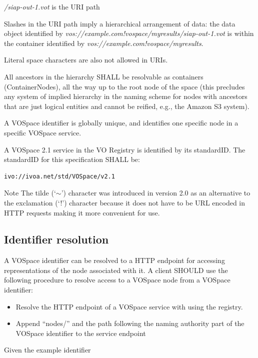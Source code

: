 \documentclass[11pt,a4paper]{ivoa}
\begin{document}
\emph{/siap-out-1.vot} is the URI path

Slashes in the URI path imply a hierarchical arrangement of data: the data object identified by \emph{vos://example.com!vospace/myresults/siap-out-1.vot} is within the container identified by \emph{vos://example.com!vospace/myresults}.

Literal space characters are also not allowed in URIs.

All ancestors in the hierarchy SHALL be resolvable as containers (ContainerNodes), all the way up to the root node of the space (this precludes any system of implied hierarchy in the naming scheme for nodes with ancestors that are just logical entities and cannot be reified, e.g., the Amazon S3 system).

A VOSpace identifier is globally unique, and identifies one specific node in a specific VOSpace service.

A VOSpace 2.1 service in the VO Registry is identified by its standardID.  The standardID for this specification SHALL be:
\begin{verbatim}
ivo://ivoa.net/std/VOSpace/v2.1
\end{verbatim}

\begin{admonition}{Note}
The tilde (`$\mathtt{\sim}$') character was introduced in version 2.0 as an alternative to the exclamation (`!') character because it does not have to be URL encoded in HTTP requests making it more convenient for use.
\end{admonition}

\subsection{Identifier resolution}
\label{subsec:identifier resolution}
A VOSpace identifier can be resolved to a HTTP endpoint for accessing representations of the node associated with it. A client SHOULD use the following procedure to resolve access to a VOSpace node from a VOSpace identifier:

\begin{itemize}
    \item Resolve the HTTP endpoint of a VOSpace service with using the registry.  
    \item Append ``nodes/'' and the path following the naming authority part of the VOSpace identifier to the service endpoint
\end{itemize}

\noindent
Given the example identifier
\end{document}
